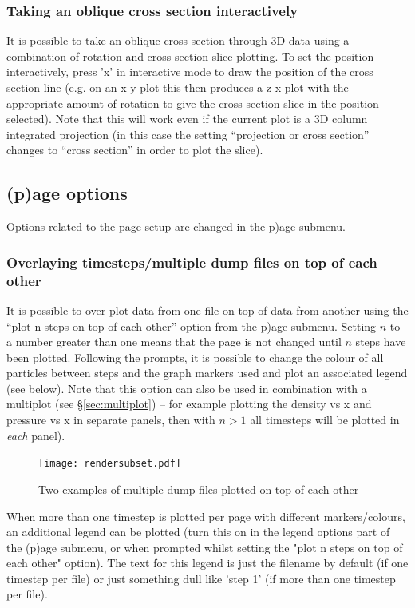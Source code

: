 \documentclass[a4paper,11pt]{article}
\begin{document}
\subsubsection{ Taking an oblique cross section interactively}
 \label{sec:obliquexsec}
 It is possible to take an oblique cross section through 3D data using a combination of rotation and cross section slice plotting. To set the position interactively, press 'x' in interactive mode to draw the position of the cross section line (e.g. on an x-y plot this then produces a z-x plot with the appropriate amount of rotation to give the cross section slice in the position selected). Note that this will work even if the current plot is a 3D column integrated projection (in this case the setting ``projection or cross section'' changes to ``cross section'' in order to plot the slice). 

\subsection{(p)age options}
\label{sec:optionspage}
 Options related to the page setup are changed in the p)age submenu.

\subsubsection{ Overlaying timesteps/multiple dump files on top of each other}
\label{sec:nstepsontopofeachother}
 It is possible to over-plot data from one file on top of data from another using the ``plot n steps on top of each other'' option from the p)age submenu. Setting $n$ to a number greater than one means that the page is not changed until $n$ steps have been plotted. Following the prompts, it is possible to change the colour of all particles between steps and the graph markers used and plot an associated legend (see below). Note that this option can also be used in combination with a multiplot (see \S\ref{sec:multiplot}) -- for example plotting the density vs x and pressure vs x in separate panels, then with $n > 1$ all timesteps will be plotted in \emph{each} panel). 

\begin{figure}[h]
\begin{center}
\texttt{[image: rendersubset.pdf]}
\caption{Two examples of multiple dump files plotted on top of each other}
\label{fig:rendersubset}
\end{center}
\end{figure}

When more than one timestep is plotted per page with different markers/colours, an additional legend can be
plotted (turn this on in the legend options part of the (p)age submenu, or when prompted whilst setting the "plot n steps on top of each other" option). The text for this legend is just the filename by default (if one timestep per file) or just something dull like 'step 1' (if more than one timestep per file). 
\end{document}
